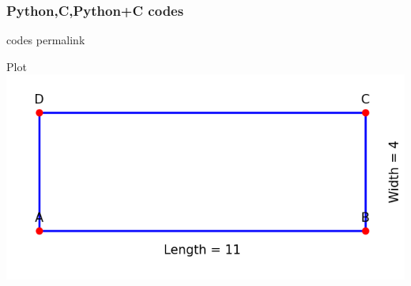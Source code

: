 \documentclass{beamer}
\begin{document}
\begin{frame}[fragile]
\frametitle{Python,C,Python+C codes}
codes permalink
\end{frame}

\begin{frame}{Plot}
    \centering
    \includegraphics[width=\columnwidth, height=0.8\textheight, keepaspectratio]{figs/fig.png}
\end{frame}
\end{document}
